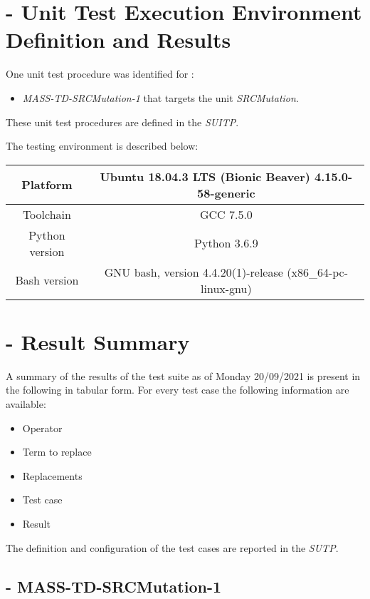 
\chapter{\MASS - Unit Test Execution Environment Definition and Results}

One unit test procedure was identified for \MASS:
\begin{itemize}
  \item {\emph{MASS-TD-SRCMutation-1}} that targets the unit \emph{SRCMutation}.
\end{itemize}

These unit test procedures are defined in the \emph{SUITP}.

The testing environment is described below:

\begin{center}
\begin{tabular}{ |c|c| }
 \hline
 Platform & Ubuntu 18.04.3 LTS (Bionic Beaver) 4.15.0-58-generic \\
 \hline
 Toolchain & GCC 7.5.0 \\
 \hline
 Python version & Python 3.6.9 \\
 \hline
 Bash version & GNU bash, version 4.4.20(1)-release (x86\_64-pc-linux-gnu) \\
 \hline
\end{tabular}
\end{center}


\chapter{\MASS - Result Summary}

A summary of the results of the test suite as of Monday 20/09/2021 is present in the following in tabular form.
For every test case the following information are available:
\begin{itemize}
  \item Operator
  \item Term to replace
  \item Replacements
  \item Test case
  \item Result
\end{itemize}

The definition and configuration of the test cases are reported in the \emph{SUTP}.

\section{\MASS - MASS-TD-SRCMutation-1}



\clearpage
